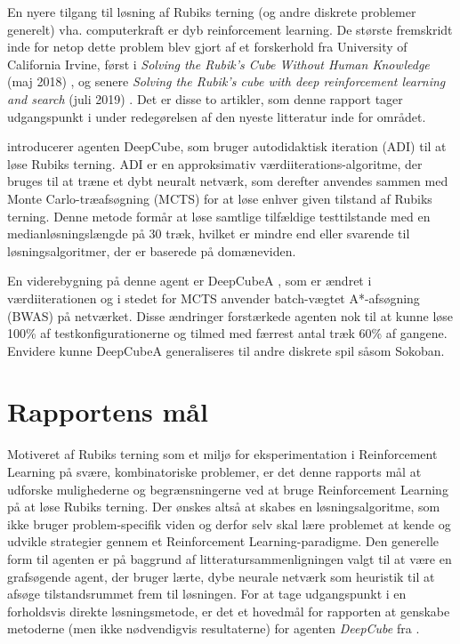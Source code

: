 \documentclass[../main.tex]{subfiles}
\begin{document}
En nyere tilgang til løsning af Rubiks terning (og andre diskrete problemer generelt) vha. computerkraft er dyb reinforcement learning. 
De største fremskridt inde for netop dette problem blev gjort af et forskerhold fra University of California Irvine, først i \textit{Solving the Rubik's Cube Without Human Knowledge} (maj 2018) \cite{HumansBeGone}, og senere \textit{Solving the Rubik’s cube with deep reinforcement learning and search} (juli 2019) \cite{SolvingNature}.
Det er disse to artikler, som denne rapport tager udgangspunkt i under redegørelsen af den nyeste litteratur inde for området. 

\cite{HumansBeGone} introducerer agenten DeepCube, som bruger autodidaktisk iteration (ADI) til at løse Rubiks terning. 
ADI er en approksimativ værdiiterations-algoritme, der bruges til at træne et dybt neuralt netværk, som derefter anvendes sammen med Monte Carlo-træafsøgning (MCTS) for at løse enhver given tilstand af Rubiks terning. 
Denne metode formår at løse samtlige tilfældige testtilstande med en medianløsningslængde på 30 træk, hvilket er mindre end eller svarende til løsningsalgoritmer, der er baserede på domæneviden.

En viderebygning på denne agent er DeepCubeA \cite{SolvingNature}, som er ændret i værdiiterationen og i stedet for MCTS anvender batch-vægtet A*-afsøgning (BWAS) på netværket. Disse ændringer forstærkede agenten nok til at kunne løse 100\% af testkonfigurationerne og tilmed med færrest antal træk 60\% af gangene. Envidere kunne DeepCubeA generaliseres til andre diskrete spil såsom Sokoban. 



\section{Rapportens mål}
Motiveret af Rubiks terning som et miljø for eksperimentation i Reinforcement Learning på svære, kombinatoriske problemer, er det denne rapports mål at udforske mulighederne og begrænsningerne ved at bruge Reinforcement Learning på at løse Rubiks terning.
Der ønskes altså at skabes en løsningsalgoritme, som ikke bruger problem-specifik viden og derfor selv skal lære problemet at kende og udvikle strategier gennem et Reinforcement Learning-paradigme. 
Den generelle form til agenten er på baggrund af litteratursammenligningen valgt til at være en grafsøgende agent, der bruger lærte, dybe neurale netværk som heuristik til at afsøge tilstandsrummet frem til løsningen. For at tage udgangspunkt i en forholdsvis direkte løsningsmetode, er det et hovedmål for rapporten at genskabe metoderne (men ikke nødvendigvis resultaterne) for agenten \textit{DeepCube} fra \cite{HumansBeGone}.
\end{document}
